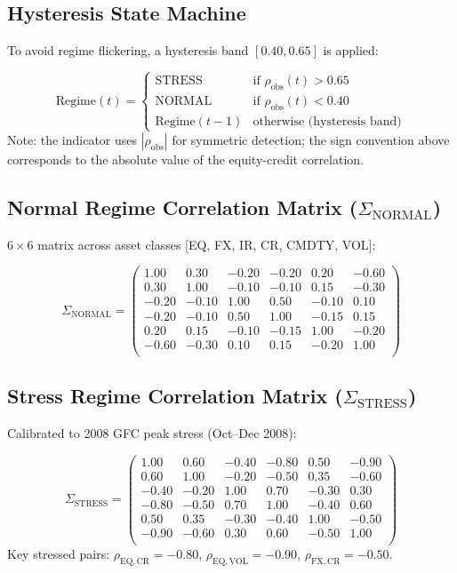 \documentclass{apex_mdd}
\begin{document}
\subsection{Hysteresis State Machine}
To avoid regime flickering, a hysteresis band $[0.40, 0.65]$ is applied:
\begin{formulabox}
\[
  \text{Regime}(t) = \begin{cases}
    \text{STRESS} & \text{if } \rho_{\mathrm{obs}}(t) > 0.65 \\
    \text{NORMAL} & \text{if } \rho_{\mathrm{obs}}(t) < 0.40 \\
    \text{Regime}(t-1) & \text{otherwise (hysteresis band)}
  \end{cases}
\]
Note: the indicator uses $|\rho_{\mathrm{obs}}|$ for symmetric detection; the sign convention above corresponds to the absolute value of the equity-credit correlation.
\end{formulabox}

\subsection{Normal Regime Correlation Matrix ($\Sigma_{\mathrm{NORMAL}}$)}
$6 \times 6$ matrix across asset classes [EQ, FX, IR, CR, CMDTY, VOL]:
\begin{formulabox}
\[
\Sigma_{\mathrm{NORMAL}} = \begin{pmatrix}
  1.00 &  0.30 & -0.20 & -0.20 &  0.20 & -0.60 \\
  0.30 &  1.00 & -0.10 & -0.10 &  0.15 & -0.30 \\
 -0.20 & -0.10 &  1.00 &  0.50 & -0.10 &  0.10 \\
 -0.20 & -0.10 &  0.50 &  1.00 & -0.15 &  0.15 \\
  0.20 &  0.15 & -0.10 & -0.15 &  1.00 & -0.20 \\
 -0.60 & -0.30 &  0.10 &  0.15 & -0.20 &  1.00 \\
\end{pmatrix}
\]
\end{formulabox}

\subsection{Stress Regime Correlation Matrix ($\Sigma_{\mathrm{STRESS}}$)}
Calibrated to 2008 GFC peak stress (Oct--Dec 2008):
\begin{formulabox}
\[
\Sigma_{\mathrm{STRESS}} = \begin{pmatrix}
  1.00 &  0.60 & -0.40 & -0.80 &  0.50 & -0.90 \\
  0.60 &  1.00 & -0.20 & -0.50 &  0.35 & -0.60 \\
 -0.40 & -0.20 &  1.00 &  0.70 & -0.30 &  0.30 \\
 -0.80 & -0.50 &  0.70 &  1.00 & -0.40 &  0.60 \\
  0.50 &  0.35 & -0.30 & -0.40 &  1.00 & -0.50 \\
 -0.90 & -0.60 &  0.30 &  0.60 & -0.50 &  1.00 \\
\end{pmatrix}
\]
Key stressed pairs: $\rho_{\mathrm{EQ,CR}} = -0.80$, $\rho_{\mathrm{EQ,VOL}} = -0.90$, $\rho_{\mathrm{FX,CR}} = -0.50$.
\end{formulabox}
\end{document}
